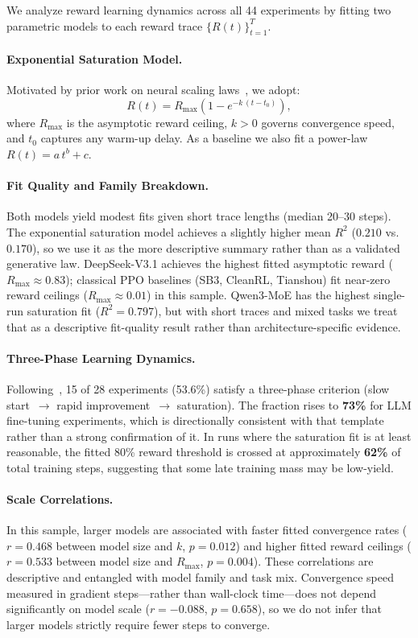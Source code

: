 \documentclass{article}
\begin{document}
We analyze reward learning dynamics across all 44 experiments by fitting two parametric
models to each reward trace $\{R(t)\}_{t=1}^{T}$.

\paragraph{Exponential Saturation Model.}
Motivated by prior work on neural scaling laws~\cite{nimmaturi2025scalinglaws}, we adopt:
\begin{equation}
  \label{eq:exp_sat}
  R(t) = R_{\max}\!\left(1 - e^{-k\,(t - t_0)}\right),
\end{equation}
where $R_{\max}$ is the asymptotic reward ceiling, $k > 0$ governs convergence speed,
and $t_0$ captures any warm-up delay.
As a baseline we also fit a power-law $R(t) = a\,t^{b} + c$.

\paragraph{Fit Quality and Family Breakdown.}
Both models yield modest fits given short trace lengths (median 20--30 steps).
The exponential saturation model achieves a slightly higher mean $R^{2}$
($0.210$ vs.\ $0.170$), so we use it as the more descriptive summary rather
than as a validated generative law. DeepSeek-V3.1 achieves the highest fitted
asymptotic reward ($R_{\max} \approx 0.83$); classical PPO baselines (SB3,
CleanRL, Tianshou) fit near-zero reward ceilings ($R_{\max} \approx 0.01$) in
this sample. Qwen3-MoE has the highest single-run saturation fit
($R^{2} = 0.797$), but with short traces and mixed tasks we treat that as a
descriptive fit-quality result rather than architecture-specific evidence.

\paragraph{Three-Phase Learning Dynamics.}
Following~\citet{nimmaturi2025scalinglaws}, 15 of 28 experiments (53.6\%)
satisfy a three-phase criterion (slow start~$\to$ rapid improvement~$\to$
saturation). The fraction rises to \textbf{73\%} for LLM fine-tuning
experiments, which is directionally consistent with that template rather than
a strong confirmation of it. In runs where the saturation fit is at least
reasonable, the fitted 80\% reward threshold is crossed at approximately
\textbf{62\%} of total training steps, suggesting that some late training mass
may be low-yield.

\paragraph{Scale Correlations.}
In this sample, larger models are associated with faster fitted convergence
rates ($r = 0.468$ between model size and $k$, $p = 0.012$) and higher fitted
reward ceilings ($r = 0.533$ between model size and $R_{\max}$, $p = 0.004$).
These correlations are descriptive and entangled with model family and task
mix. Convergence speed measured in gradient steps---rather than wall-clock
time---does not depend significantly on model scale ($r = -0.088$, $p =
0.658$), so we do not infer that larger models strictly require fewer steps to
converge.
\end{document}
